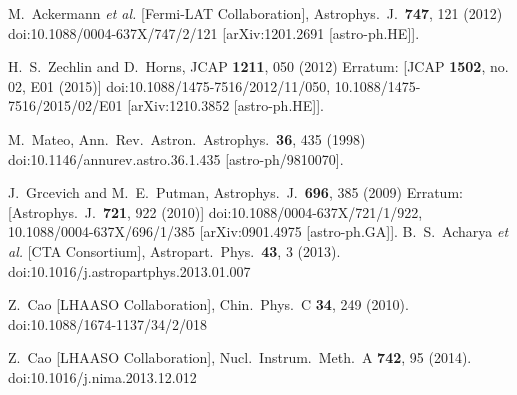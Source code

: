\documentclass[12pt,prd,showpacs,amsmath,amssymb,aps,floats,floatfix,nofootinbib]{revtex4-1}
\begin{document}
\begin{thebibliography}{99}
  M.~Ackermann {\it et al.} [Fermi-LAT Collaboration],
  Astrophys.\ J.\  {\bf 747}, 121 (2012)
  doi:10.1088/0004-637X/747/2/121
  [arXiv:1201.2691 [astro-ph.HE]].

  H.~S.~Zechlin and D.~Horns,
  JCAP {\bf 1211}, 050 (2012)
  Erratum: [JCAP {\bf 1502}, no. 02, E01 (2015)]
  doi:10.1088/1475-7516/2012/11/050, 10.1088/1475-7516/2015/02/E01
  [arXiv:1210.3852 [astro-ph.HE]].

  M.~Mateo,
  Ann.\ Rev.\ Astron.\ Astrophys.\  {\bf 36}, 435 (1998)
  doi:10.1146/annurev.astro.36.1.435
  [astro-ph/9810070].

  J.~Grcevich and M.~E.~Putman,
  Astrophys.\ J.\  {\bf 696}, 385 (2009)
  Erratum: [Astrophys.\ J.\  {\bf 721}, 922 (2010)]
  doi:10.1088/0004-637X/721/1/922, 10.1088/0004-637X/696/1/385
  [arXiv:0901.4975 [astro-ph.GA]].
  B.~S.~Acharya {\it et al.} [CTA Consortium],
  Astropart.\ Phys.\  {\bf 43}, 3 (2013).
  doi:10.1016/j.astropartphys.2013.01.007

  Z.~Cao [LHAASO Collaboration],
  Chin.\ Phys.\ C {\bf 34}, 249 (2010).
  doi:10.1088/1674-1137/34/2/018

  Z.~Cao [LHAASO Collaboration],
  Nucl.\ Instrum.\ Meth.\ A {\bf 742}, 95 (2014).
  doi:10.1016/j.nima.2013.12.012


\end{thebibliography}
\end{document}
